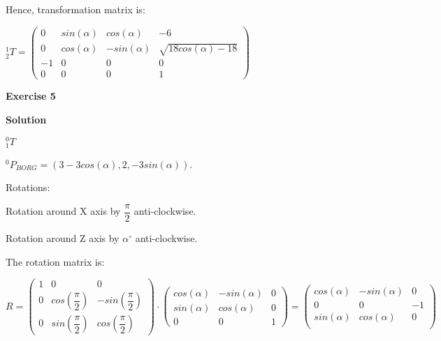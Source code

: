 \documentclass[12pt]{article}
\begin{document}
\begin{list}{)~}{}
Hence, transformation matrix is:

$_{2}^{1}T = \left(\begin{array}{cccc}
0 & sin\left(\alpha\right)& cos\left(\alpha\right) & -6\\
0 & cos\left(\alpha\right) & -sin\left(\alpha\right) & \sqrt{18 cos(\alpha) - 18} \\
-1 & 0 & 0 & 0 \\
0 & 0 & 0 & 1\end{array}\right)$

\end{list}

\newpage
\textbf{Exercise 5}		
		
\textbf{Solution}

\begin{list}{)~}{}
\item
$_{1}^{0}T$

$^0 P_{BORG} = \left(3-3cos\left(\alpha\right), 2, -3sin\left(\alpha\right)\right)$.

Rotations:

\begin{list}{)~}{}
\item Rotation around X axis by $\dfrac{\pi}{2}$ anti-clockwise.
\item Rotation around Z axis by $\alpha^\circ$ anti-clockwise.
\end{list}

The rotation matrix is:

$R= 
\left(\begin{array}{ccc}
1 & 0 & 0\\
0 & cos\left(\dfrac{\pi}{2}\right) & -sin\left(\dfrac{\pi}{2}\right)\\
0 & sin\left(\dfrac{\pi}{2}\right) & cos\left(\dfrac{\pi}{2}\right)\end{array}\right)
\cdot 
\left(\begin{array}{ccc}
cos\left(\alpha\right) & -sin\left(\alpha\right) & 0 \\
sin\left(\alpha\right) & cos\left(\alpha\right) & 0\\
0 & 0 & 1\end{array}\right)
= 
\left(\begin{array}{ccc}
cos\left(\alpha\right) & -sin\left(\alpha\right) & 0 \\
0 &  0  & -1\\
sin\left(\alpha\right) & cos\left(\alpha\right) & 0\\ \end{array}\right)$


\end{list}
\end{document}
